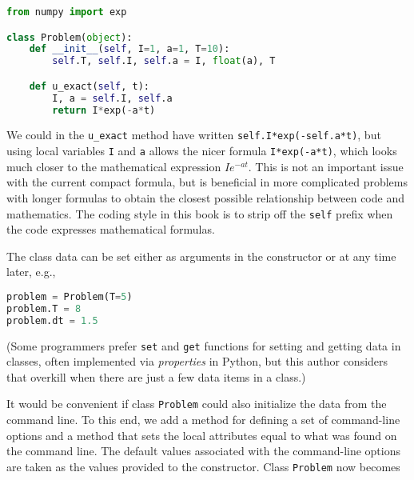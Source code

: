 \documentclass[graybox,sectrefs,envcountresetchap,open=right,final]{svmonodo}
\begin{document}
\begin{lstlisting}[language=python,style=blue1_bluegreen]
from numpy import exp

class Problem(object):
    def __init__(self, I=1, a=1, T=10):
        self.T, self.I, self.a = I, float(a), T

    def u_exact(self, t):
        I, a = self.I, self.a
        return I*exp(-a*t)

\end{lstlisting}

We could in the \Verb!u_exact! method have written
\texttt{self.I*exp(-self.a*t)}, but using local variables \texttt{I} and \texttt{a} allows
the nicer formula \texttt{I*exp(-a*t)}, which looks much closer to the mathematical
expression $Ie^{-at}$.  This is not an important issue with the
current compact formula, but is beneficial in more complicated
problems with longer formulas to obtain the closest possible
relationship between code and mathematics. The coding style in
this book is to strip
off the \texttt{self} prefix when the code expresses mathematical formulas.

The class data can be set either as arguments in the constructor or
at any time later, e.g.,





\begin{lstlisting}[language=python,style=blue1_bluegreen]
problem = Problem(T=5)
problem.T = 8
problem.dt = 1.5

\end{lstlisting}

(Some programmers prefer \texttt{set} and \texttt{get} functions for setting and getting
data in classes, often implemented via \emph{properties} in Python, but
this author considers that overkill when there are just a few data items
in a class.)

It would be convenient if class \texttt{Problem} could also initialize
the data from the command line. To this end, we add a method for
defining a set of command-line options and a method that sets the
local attributes equal to what was found on the command line.
The default values associated with the command-line options are taken
as the values provided to the constructor. Class \texttt{Problem} now becomes
\end{document}
